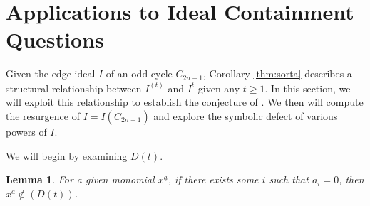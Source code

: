 \documentclass[12pt]{amsart}
\renewcommand{\geq}{\geqslant}
\renewcommand{\ge}{\geqslant}
\theoremstyle{plain}
\newtheorem{lem}[theorem]{Lemma}
\theoremstyle{definition}
\begin{document}
\section{Applications to Ideal Containment Questions}

Given the edge ideal $I$ of an odd cycle $C_{2n+1}$, Corollary \ref{thm:sorta} describes a structural relationship between $I^{(t)}$ and $I^t$ given any $t \ge 1$.
In this section, we will exploit this relationship to establish the conjecture of \cite{2004:worthenelliswilson}.
We then will compute the resurgence of $I=I(C_{2n+1})$ and explore the symbolic defect of various powers of $I$. %



\begin{comment}
\[
	L(t) = \{x^{\underline{a}} | \deg(x^{\underline{a}}) \geq 2t \text{ and for all minimal vertex covers } V', \, w_{V'}(x^{\underline{a}}) \geq t\}
	\]
and
\[
	D(t) = \{x^{\underline{a}} | \deg(x^{\underline{a}}) <2t \text{ and for all minimal vertex covers } V', \, w_{V'}(x^{\underline{a}}) \geq t\}.
\]
\end{comment}
We will begin by examining $D(t)$. %


\begin{lem}\label{lem:nozero}
For a given monomial $x^{\underline{a}}$, if there exists some $i$ such that $a_i = 0$, then $x^{\underline{a}} \not \in (D(t))$.
\end{lem}
\end{document}
